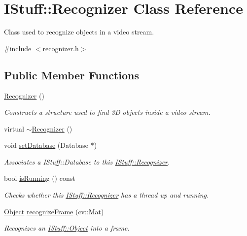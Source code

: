 \hypertarget{class_i_stuff_1_1_recognizer}{\section{I\-Stuff\-:\-:Recognizer Class Reference}
\label{class_i_stuff_1_1_recognizer}
}


Class used to recognize objects in a video stream.  




{\ttfamily \#include $<$recognizer.\-h$>$}

\subsection*{Public Member Functions}
\begin{DoxyCompactItemize}
\item 
\hyperlink{class_i_stuff_1_1_recognizer_a4bf77b760d8dbc50c4ef50cad433db40}{Recognizer} ()
\begin{DoxyCompactList}\small\item\em Constructs a structure used to find 3\-D objects inside a video stream. \end{DoxyCompactList}\item 
virtual \hyperlink{class_i_stuff_1_1_recognizer_aa0035e71951a13fe00764a54913d0e5a}{$\sim$\-Recognizer} ()
\item 
void \hyperlink{class_i_stuff_1_1_recognizer_a37fe89eb44d68215cab011b1962b8293}{set\-Database} (Database $\ast$)
\begin{DoxyCompactList}\small\item\em Associates a I\-Stuff\-::\-Database to this \hyperlink{class_i_stuff_1_1_recognizer}{I\-Stuff\-::\-Recognizer}. \end{DoxyCompactList}\item 
bool \hyperlink{class_i_stuff_1_1_recognizer_aac5297071c1f6ff12049a58c88bb3952}{is\-Running} () const 
\begin{DoxyCompactList}\small\item\em Checks whether this \hyperlink{class_i_stuff_1_1_recognizer}{I\-Stuff\-::\-Recognizer} has a thread up and running. \end{DoxyCompactList}\item 
\hyperlink{class_i_stuff_1_1_object}{Object} \hyperlink{class_i_stuff_1_1_recognizer_a6505a142d08eaf1e8f6a1f95571a4c7a}{recognize\-Frame} (cv\-::\-Mat)
\begin{DoxyCompactList}\small\item\em Recognizes an \hyperlink{class_i_stuff_1_1_object}{I\-Stuff\-::\-Object} into a frame. \end{DoxyCompactList}\item 

\end{DoxyCompactItemize}

